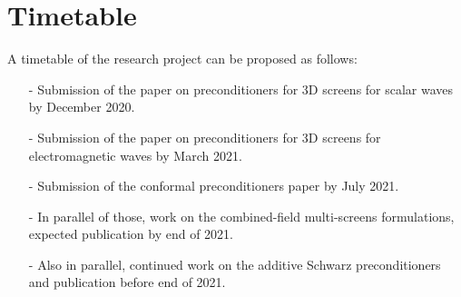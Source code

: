 \documentclass[]{article}
\begin{document}
\section{Timetable}

A timetable of the research project can be proposed as follows:
\begin{itemize}\itemsep-0.2em 
	\item[-] Submission of the paper on preconditioners for 3D screens for scalar waves by December 2020.
	\item[-] Submission of the paper on preconditioners for 3D screens for electromagnetic waves by March 2021.
	\item[-] Submission of the conformal preconditioners paper by July 2021.
	\item[-] In parallel of those, work on the combined-field multi-screens formulations, expected publication by end of 2021. 
	\item[-] Also in parallel, continued work on the additive Schwarz preconditioners and publication before end of 2021.
\end{itemize}
\end{document}
